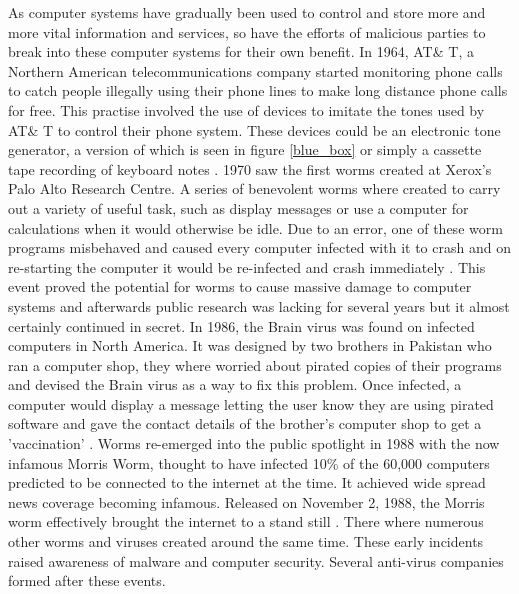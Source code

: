 As computer systems have gradually been used to control and store more and more vital information and services, so have the efforts of malicious parties to break into these computer systems for their own benefit. In 1964, AT\& T, a Northern American telecommunications company started monitoring phone calls to catch people illegally using their phone lines to make long distance phone calls for free. This practise involved the use of devices to imitate the tones used by AT\& T to control their phone system. These devices could be an electronic tone generator, a version of which is seen in figure \ref{blue_box} or simply a cassette tape recording of keyboard notes
\cite{RN56}. 1970 saw the first worms created at Xerox's Palo Alto Research Centre. A series of benevolent worms where created to carry out a variety of useful task, such as display messages or use a computer for calculations when it would otherwise be idle. Due to an error, one of these worm programs misbehaved and caused every computer infected with it to crash and on re-starting the computer it would be re-infected and crash immediately 
\cite{RN93}. This event proved the potential for worms to cause massive damage to computer systems and afterwards public research was lacking for several years but it almost certainly continued in secret. In 1986, the Brain virus was found on infected computers in North America. It was designed by two brothers in Pakistan who ran a computer shop, they where worried about pirated copies of their programs and devised the Brain virus as a way to fix this problem. Once infected, a computer would display a message letting the user know they are using pirated software and gave the contact details of the brother's computer shop to get a 'vaccination' 
\cite{RN86}. Worms re-emerged into the public spotlight in 1988 with the now infamous Morris Worm, thought to have infected 10\% of the 60,000 computers predicted to be connected to the internet at the time. It achieved wide spread news coverage becoming infamous. Released on November 2, 1988, the Morris worm effectively brought the internet to a stand still 
\cite{RN90}. There where numerous other worms and viruses created around the same time. These early incidents raised awareness of malware and computer security. Several anti-virus companies formed after these events.

